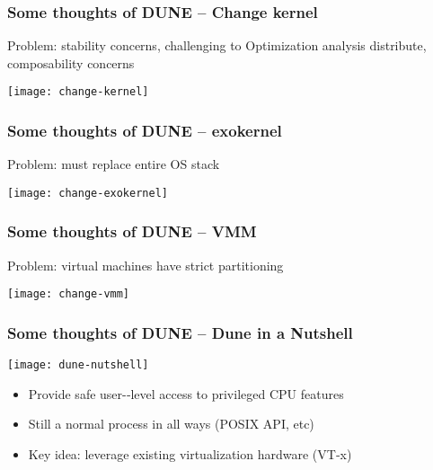 \begin{frame}[plain]
	\frametitle{ Some thoughts of DUNE -- Change kernel}
	
			\centering
			\Large
			Problem:	
 stability	
 concerns,	
 challenging	
 to	
  Optimization	
 analysis
			distribute,	
 composability	
 concerns	
  
			
			\texttt{[image: change-kernel]}
			
	
	
\end{frame}


\begin{frame}[plain]
	\frametitle{ Some thoughts of DUNE -- exokernel}
	
	\centering
	\Large
	Problem:	 must	 replace	 entire	 OS	 stack	
  
	
	\texttt{[image: change-exokernel]}
	
	
	
\end{frame}


\begin{frame}[plain]
	\frametitle{ Some thoughts of DUNE -- VMM}
	
	\centering
	\Large
	Problem:	virtual	machines	have	strict	partitioning	
  
	
	\texttt{[image: change-vmm]}
	
	
	
\end{frame}


\begin{frame}[plain]
	\frametitle{ Some thoughts of DUNE -- Dune in a Nutshell}
	
	\centering
	
  
	
	\texttt{[image: dune-nutshell]}
	\centering
	\begin{itemize}
		\item Provide	 safe user-­‐level	 access	 to	 privileged	 CPU	 features
		\item Still  a	 normal	 process	 in	 all	 ways	 (POSIX	 API,	 etc)	
		\item Key
 idea:
 leverage existing virtualization hardware (VT‐x)	
  		
	\end{itemize}		
	
\end{frame}


